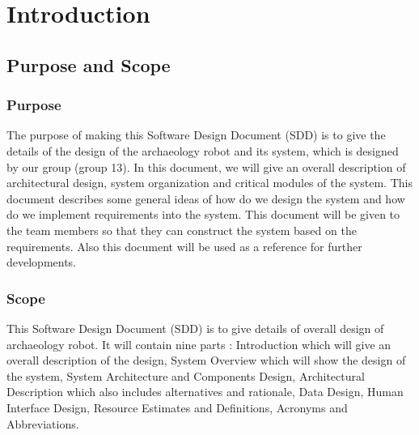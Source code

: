 \documentclass[11pt, a4paper]{report}
\begin{document}
\begin{tabular}{| l | l | l | l | }
%





\end{tabular}
\clearpage


\chapter{Introduction}%
\label{cha:I}


\section{Purpose and Scope}
\subsection{Purpose}
The purpose of making this Software Design Document (SDD) is to give the details of the design of the archaeology robot and its system, which is designed by our group (group 13). In this document, we will give an overall description of architectural design, system organization and critical modules of the system. This document describes some general ideas of how do we design the system and how do we implement requirements into the system. This document will be given to the team members so that they can construct the system based on the requirements. Also this document will be used as a reference for further developments.


\subsection{Scope}
This Software Design Document (SDD) is to give details  of overall design of archaeology robot. It will contain nine parts : Introduction which will give an overall description of the design, System Overview which will show the design of the system, System Architecture and Components Design, Architectural Description which also includes alternatives and rationale, Data Design, Human Interface Design, Resource Estimates and Definitions, Acronyms and Abbreviations.
\end{document}

